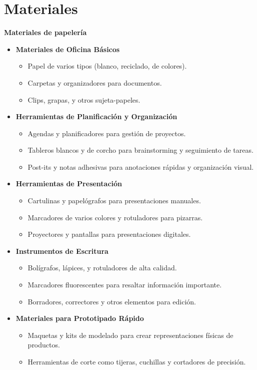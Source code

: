 \newpage
\section{Materiales}
\textbf{Materiales de papelería}
\begin{itemize}
  \item \textbf{Materiales de Oficina Básicos}
  \begin{itemize}
      \item Papel de varios tipos (blanco, reciclado, de colores).
      \item Carpetas y organizadores para documentos.
      \item Clips, grapas, y otros sujeta-papeles.
  \end{itemize}
  
  \item \textbf{Herramientas de Planificación y Organización}
  \begin{itemize}
      \item Agendas y planificadores para gestión de proyectos.
      \item Tableros blancos y de corcho para brainstorming y seguimiento de tareas.
      \item Post-its y notas adhesivas para anotaciones rápidas y organización visual.
  \end{itemize}
  
  \item \textbf{Herramientas de Presentación}
  \begin{itemize}
      \item Cartulinas y papelógrafos para presentaciones manuales.
      \item Marcadores de varios colores y rotuladores para pizarras.
      \item Proyectores y pantallas para presentaciones digitales.
  \end{itemize}
  
  \item \textbf{Instrumentos de Escritura}
  \begin{itemize}
      \item Bolígrafos, lápices, y rotuladores de alta calidad.
      \item Marcadores fluorescentes para resaltar información importante.
      \item Borradores, correctores y otros elementos para edición.
  \end{itemize}
  
  \item \textbf{Materiales para Prototipado Rápido}
  \begin{itemize}
      \item Maquetas y kits de modelado para crear representaciones físicas de productos.
      \item Herramientas de corte como tijeras, cuchillas y cortadores de precisión.
  \end{itemize}
  

\end{itemize}
